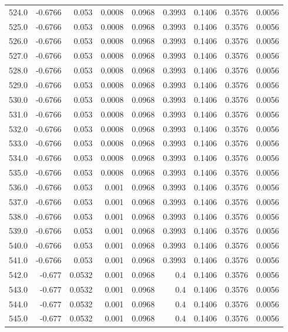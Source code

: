 \begin{longtable}{lrrrrrrrr}
524.0 & -0.6766 & 0.053 & 0.0008 & 0.0968 & 0.3993 & 0.1406 & 0.3576 & 0.0056 \\
525.0 & -0.6766 & 0.053 & 0.0008 & 0.0968 & 0.3993 & 0.1406 & 0.3576 & 0.0056 \\
526.0 & -0.6766 & 0.053 & 0.0008 & 0.0968 & 0.3993 & 0.1406 & 0.3576 & 0.0056 \\
527.0 & -0.6766 & 0.053 & 0.0008 & 0.0968 & 0.3993 & 0.1406 & 0.3576 & 0.0056 \\
528.0 & -0.6766 & 0.053 & 0.0008 & 0.0968 & 0.3993 & 0.1406 & 0.3576 & 0.0056 \\
529.0 & -0.6766 & 0.053 & 0.0008 & 0.0968 & 0.3993 & 0.1406 & 0.3576 & 0.0056 \\
530.0 & -0.6766 & 0.053 & 0.0008 & 0.0968 & 0.3993 & 0.1406 & 0.3576 & 0.0056 \\
531.0 & -0.6766 & 0.053 & 0.0008 & 0.0968 & 0.3993 & 0.1406 & 0.3576 & 0.0056 \\
532.0 & -0.6766 & 0.053 & 0.0008 & 0.0968 & 0.3993 & 0.1406 & 0.3576 & 0.0056 \\
533.0 & -0.6766 & 0.053 & 0.0008 & 0.0968 & 0.3993 & 0.1406 & 0.3576 & 0.0056 \\
534.0 & -0.6766 & 0.053 & 0.0008 & 0.0968 & 0.3993 & 0.1406 & 0.3576 & 0.0056 \\
535.0 & -0.6766 & 0.053 & 0.0008 & 0.0968 & 0.3993 & 0.1406 & 0.3576 & 0.0056 \\
536.0 & -0.6766 & 0.053 & 0.001 & 0.0968 & 0.3993 & 0.1406 & 0.3576 & 0.0056 \\
537.0 & -0.6766 & 0.053 & 0.001 & 0.0968 & 0.3993 & 0.1406 & 0.3576 & 0.0056 \\
538.0 & -0.6766 & 0.053 & 0.001 & 0.0968 & 0.3993 & 0.1406 & 0.3576 & 0.0056 \\
539.0 & -0.6766 & 0.053 & 0.001 & 0.0968 & 0.3993 & 0.1406 & 0.3576 & 0.0056 \\
540.0 & -0.6766 & 0.053 & 0.001 & 0.0968 & 0.3993 & 0.1406 & 0.3576 & 0.0056 \\
541.0 & -0.6766 & 0.053 & 0.001 & 0.0968 & 0.3993 & 0.1406 & 0.3576 & 0.0056 \\
542.0 & -0.677 & 0.0532 & 0.001 & 0.0968 & 0.4 & 0.1406 & 0.3576 & 0.0056 \\
543.0 & -0.677 & 0.0532 & 0.001 & 0.0968 & 0.4 & 0.1406 & 0.3576 & 0.0056 \\
544.0 & -0.677 & 0.0532 & 0.001 & 0.0968 & 0.4 & 0.1406 & 0.3576 & 0.0056 \\
545.0 & -0.677 & 0.0532 & 0.001 & 0.0968 & 0.4 & 0.1406 & 0.3576 & 0.0056 \\

\end{longtable}
